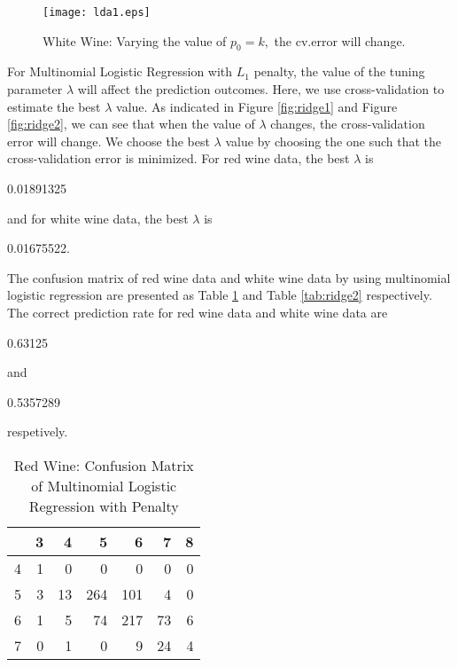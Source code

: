 \documentclass[12pt]{article}
\begin{document}
\begin{figure} [htbp]
 \begin{center}
\texttt{[image: lda1.eps]}
\caption{White Wine: Varying the value of $p_0=k,$ the cv.error will change.}
 \label{fig:knn1}
\end{center}
\end{figure}

\newpage

For Multinomial Logistic Regression with $L_1$ penalty, the value of the tuning parameter $\lambda$ will affect the prediction outcomes. Here, we use cross-validation to estimate the best $\lambda$ value. As indicated in Figure \ref{fig:ridge1} and Figure \ref{fig:ridge2}, we can see that when the value of $\lambda$ changes, the cross-validation error will change. We choose the best $\lambda$ value by choosing the one such that the cross-validation error is minimized. For red wine data, the best $\lambda$ is
\begin{Schunk}
\begin{Soutput}
[1] 0.01891325
\end{Soutput}
\end{Schunk}
and for white wine data, the best $\lambda$ is
\begin{Schunk}
\begin{Soutput}
[1] 0.01675522.
\end{Soutput}
\end{Schunk}
The confusion matrix of red wine data and white wine data by using multinomial logistic regression are presented as Table \ref{tab:ridge1} and Table \ref{tab:ridge2} respectively. The correct prediction rate for red wine data and white wine data are 
\begin{Schunk}
\begin{Soutput}
[1] 0.63125
\end{Soutput}
\end{Schunk}
and 
\begin{Schunk}
\begin{Soutput}
[1] 0.5357289
\end{Soutput}
\end{Schunk}
respetively.

\begin{center}
\begin{table}[htbp]
\centering
\begin{tabular}{rrrrrrr}
  \hline
 & 3 & 4 & 5 & 6 & 7 & 8 \\
  \hline
4 &   1 &   0 &   0 &   0 &   0 &   0 \\
  5 &   3 &  13 & 264 & 101 &   4 &   0 \\
  6 &   1 &   5 &  74 & 217 &  73 &   6 \\
  7 &   0 &   1 &   0 &   9 &  24 &   4 \\
   \hline
\end{tabular}
\caption{Red Wine: Confusion Matrix of Multinomial Logistic Regression with Penalty}
\label{tab:ridge1}
\end{table}\end{center}
\end{document}
